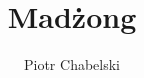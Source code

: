 \documentclass[hidelinks,12pt]{wzmgr}
\author{Piotr Chabelski}
\title{Madżong}
\begin{document}
\onehalfspacing
\maketitle



%
\printindex


\end{document}
